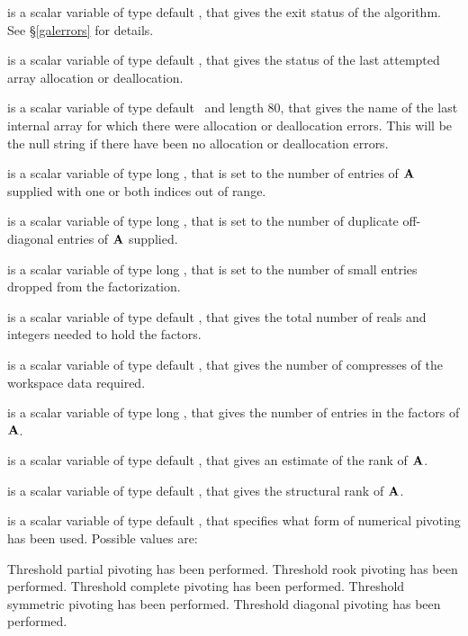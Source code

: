 \documentclass{galahad}
\begin{document}
\begin{description}

 is a scalar variable of type default \integer, that gives the
exit status of the algorithm.
See \S\ref{galerrors}
for details.

 is a scalar variable of type default \integer, that gives
the status of the last attempted array allocation or deallocation.

 is a scalar variable of type default \character\
and length 80, that  gives the name of the last internal array
for which there were allocation or deallocation errors.
This will be the null string if there have been no
allocation or deallocation errors.


 is a scalar variable of type long \integer,
that is set to the number of
entries of ${\mathbf{A}}$ supplied with one or both indices out of range.

 is a scalar variable of type long \integer,
that is set to the number of duplicate off-diagonal entries of ${\mathbf{A}}$ supplied.

 is a scalar variable of type long \integer,
that is set to the number of small entries dropped from the factorization.

 is a scalar variable of type default \integer,
that gives the total number of reals and integers needed to hold the
factors.

 is a scalar variable of type default \integer,
that gives the number of compresses of the workspace data required.

 is a scalar variable of type long \integer,
that gives the number of entries in the factors of ${\mathbf{A}}$.

 is a scalar variable of type default \integer,
that gives an estimate of the rank of ${\mathbf{A}}$.

 is a scalar variable of type default \integer,
that gives the structural rank of ${\mathbf{A}}$.

 is a scalar variable of type default \integer,
that specifies what form of numerical pivoting has been used.
Possible values are:
\begin{description}
   Threshold partial pivoting has been performed.
   Threshold rook pivoting has been performed.
   Threshold complete pivoting has been performed.
   Threshold symmetric pivoting has been performed.
   Threshold diagonal pivoting has been performed.
\end{description}


\end{description}
\end{document}
